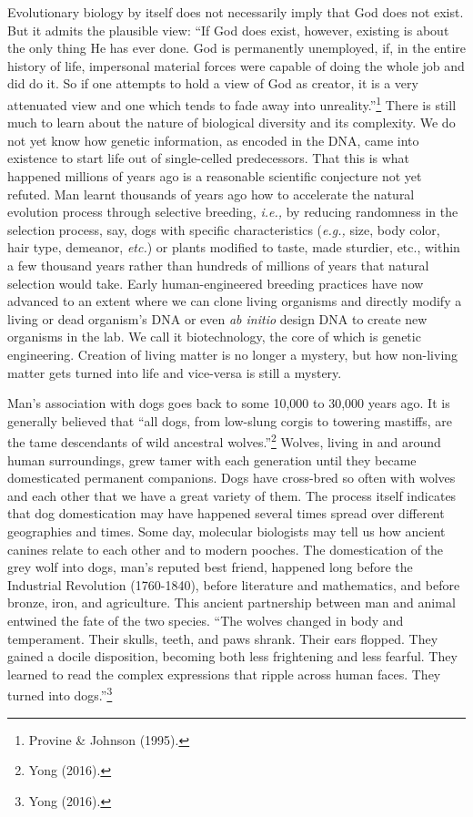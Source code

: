 \begin{multicols}{2}
Evolutionary biology by itself does not necessarily imply that God does not exist. But it admits the plausible view: “If God does exist, however, existing is about the only thing He has ever done. God is permanently unemployed, if, in the entire history of life, impersonal material forces were capable of doing the whole job and did do it. So if one attempts to hold a view of God as creator, it is a very attenuated view and one which tends to fade away into unreality.”\footnote{Provine \& Johnson (1995).}  There is still much to learn about the nature of biological diversity and its complexity. We do not yet know how genetic information, as encoded in the DNA, came into existence to start life out of single-celled predecessors. That this is what happened millions of years ago is a reasonable scientific conjecture not yet refuted. Man learnt thousands of years ago how to accelerate the natural evolution process through selective breeding, \textit{i.e.,} by reducing randomness in the selection process, say, dogs with specific characteristics (\textit{e.g.,} size, body color, hair type, demeanor, \textit{etc.}) or plants modified to taste, made sturdier, etc., within a few thousand years rather than hundreds of millions of years that natural selection would take. Early human-engineered breeding practices have now advanced to an extent where we can clone living organisms and directly modify a living or dead organism's DNA or even \textit{ab initio} design DNA to create new organisms in the lab. We call it biotechnology, the core of which is genetic engineering. Creation of living matter is no longer a mystery, but how non-living matter gets turned into life and vice-versa is still a mystery.

Man's association with dogs goes back to some 10,000 to 30,000 years ago. It is generally believed that “all dogs, from low-slung corgis to towering mastiffs, are the tame descendants of wild ancestral wolves.”\footnote{Yong (2016).} Wolves, living in and around human surroundings, grew tamer with each generation until they became domesticated permanent companions. Dogs have cross-bred so often with wolves and each other that we have a great variety of them. The process itself indicates that dog domestication may have happened several times spread over different geographies and times. Some day, molecular biologists may tell us how ancient canines relate to each other and to modern pooches. The domestication of the grey wolf into dogs, man's reputed best friend, happened long before the Industrial Revolution (1760-1840), before literature and mathematics, and before bronze, iron, and agriculture. This ancient partnership between man and animal entwined the fate of the two species. “The wolves changed in body and temperament. Their skulls, teeth, and paws shrank. Their ears flopped. They gained a docile disposition, becoming both less frightening and less fearful. They learned to read the complex expressions that ripple across human faces. They turned into dogs.”\footnote{Yong (2016).}


\end{multicols}
